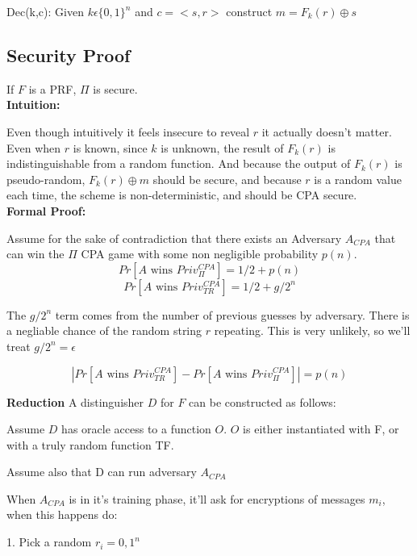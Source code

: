 \documentclass[11pt]{article}
\begin{document}
\hspace{\parindent} Dec(k,c): Given $k \epsilon \{0,1\}^n$ and $c=<s,r>$ construct $m= F_k(r)\oplus s$


\subsection*{Security Proof}

If $F$ is a PRF, $\Pi$ is secure.\\

\textbf{Intuition:}

Even though intuitively it feels insecure to reveal $r$ it actually doesn't matter. Even when $r$ is known, since $k$ is unknown, the result of $F_k(r)$ is indistinguishable from a random function. And because the output of $F_k(r)$ is pseudo-random, $F_k(r) \oplus m $ should be secure, and because $r$ is a random value each time, the scheme is non-deterministic, and should be CPA secure. \\


\textbf{Formal Proof:}

Assume for the sake of contradiction that there exists an Adversary $A_{CPA}$ that can win the $\Pi$ CPA game with some non negligible probability $p(n)$.\\


$$Pr[A \textrm{ wins } Priv_\Pi^{CPA}] = 1/2 + p(n)$$
$$Pr[A \textrm{ wins } Priv_{TR}^{CPA}] = 1/2 + g/2^n$$

The $g/2^n$ term comes from the number of previous guesses by adversary. There is a negliable chance of the random string $r$ repeating. This is very unlikely, so we'll treat $g/2^n = \epsilon$


$$|Pr[A \textrm{ wins } Priv_{TR}^{CPA}]-Pr[A \textrm{ wins } Priv_\Pi^{CPA}] | = p(n)$$

\textbf{Reduction}
A distinguisher $D$ for $F$ can be constructed as follows:

	\hspace{\parindent}Assume $D$ has oracle access to a function $O$. $O$ is either instantiated with F, or with a truly random function TF.
	
	\hspace{\parindent}Assume also that D can run adversary $A_{CPA}$
	
	\hspace{\parindent}When $A_{CPA}$ is in it's training phase, it'll ask for encryptions of messages $m_i$, when this happens do:
	
	\hspace{\parindent} 1. Pick a random $r_i = {0,1}^n$
	
\end{document}
